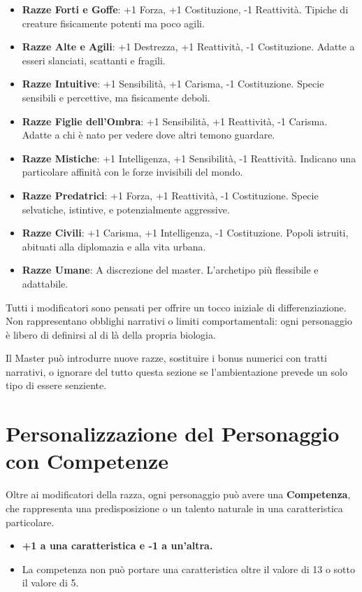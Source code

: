 \documentclass[../manuale_main.tex]{subfiles}
\begin{document}
\begin{itemize}
  \item \textbf{Razze Forti e Goffe}: +1 Forza, +1 Costituzione, -1 Reattività. Tipiche di creature fisicamente potenti ma poco agili.
  \item \textbf{Razze Alte e Agili}: +1 Destrezza, +1 Reattività, -1 Costituzione. Adatte a esseri slanciati, scattanti e fragili.
  \item \textbf{Razze Intuitive}: +1 Sensibilità, +1 Carisma, -1 Costituzione. Specie sensibili e percettive, ma fisicamente deboli.
  \item \textbf{Razze Figlie dell’Ombra}: +1 Sensibilità, +1 Reattività, -1 Carisma. Adatte a chi è nato per vedere dove altri temono guardare.
  \item \textbf{Razze Mistiche}: +1 Intelligenza, +1 Sensibilità, -1 Reattività. Indicano una particolare affinità con le forze invisibili del mondo.
  \item \textbf{Razze Predatrici}: +1 Forza, +1 Reattività, -1 Costituzione. Specie selvatiche, istintive, e potenzialmente aggressive.
  \item \textbf{Razze Civili}: +1 Carisma, +1 Intelligenza, -1 Costituzione. Popoli istruiti, abituati alla diplomazia e alla vita urbana.
  \item \textbf{Razze Umane}: A discrezione del master. L’archetipo più flessibile e adattabile.
\end{itemize}

\medskip
Tutti i modificatori sono pensati per offrire un tocco iniziale di differenziazione. Non rappresentano obblighi narrativi o limiti comportamentali: ogni personaggio è libero di definirsi al di là della propria biologia.

\medskip
Il Master può introdurre nuove razze, sostituire i bonus numerici con tratti narrativi, o ignorare del tutto questa sezione se l’ambientazione prevede un solo tipo di essere senziente.

\vspace{0.3cm}

\section{Personalizzazione del Personaggio con Competenze}
Oltre ai modificatori della razza, ogni personaggio può avere una \textbf{Competenza}, che rappresenta una predisposizione o un talento naturale in una caratteristica particolare. 

\begin{itemize}
    \item \textbf{+1 a una caratteristica e -1 a un’altra.}
    \item La competenza non può portare una caratteristica oltre il valore di 13 o sotto il valore di 5.
\end{itemize}
\end{document}
